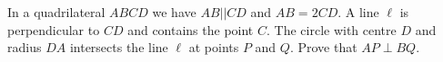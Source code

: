 In a quadrilateral $ABCD$ we have $AB||CD$ and $AB=2CD$. A line $\ell$ is perpendicular to $CD$ and contains the point $C$. The circle with centre $D$ and radius $DA$ intersects the line $\ell$ at points $P$ and $Q$. Prove that $AP\perp BQ$.